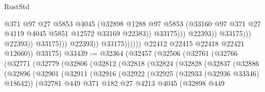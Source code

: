 \begin{lexlean}{RustStd}
\begin{coremodule}
                                                    @371
                                                    @97
                                                    @27
                                                    @5853
                                                    @4045
                                                    (@32898
                                                      @1288
                                                      @97
                                                      @5853
                                                      (@33160
                                                        @97
                                                        @371
                                                        @27
                                                        @4119
                                                        @4045
                                                        @5851
                                                        @12572
                                                        @33169
                                                        @22383))
                                                    @33175)))
                                              @22393))
                                          @33175)))
                                    @22393))
                                @33175)))
                          @22393))
                      @33175))))))
          @22412
          @22415
          @22418
          @22421
          @12660))
      @33175)
@33439 := @32364
    (@32457
      (@32506
        (@32761
          (@32766
            (@32771
              (@32779
                (@32806
                  (@32812
                    (@32818
                      (@32824
                        (@32828
                          (@32837
                            (@32886
                              (@32896
                                (@32901
                                  (@32911
                                    (@32916
                                      (@32922
                                        (@32925 (@32933 (@32936 @33346) @18642))
                                        (@32781
                                          @449
                                          @371
                                          @182
                                          @27
                                          @4213
                                          @4045
                                          (@32898
                                            @449

\end{coremodule}
\end{lexlean}
